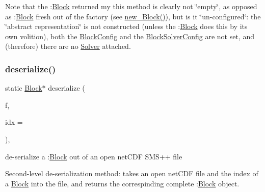 Note that the \+:\mbox{\hyperlink{class_s_m_spp__di__unipi__it_1_1_block}{Block}} returned my this method is clearly not \char`\"{}empty\char`\"{}, as opposed as \+:\mbox{\hyperlink{class_s_m_spp__di__unipi__it_1_1_block}{Block}} fresh out of the factory (see \mbox{\hyperlink{class_s_m_spp__di__unipi__it_1_1_block_a0fb67cbfab69b75e3bc6ad92d581bd2e}{new\+\_\+\+Block()}}), but is it \char`\"{}un-\/configured\char`\"{}\+: the \char`\"{}abstract representation\char`\"{} is not constructed (unless the \+:\mbox{\hyperlink{class_s_m_spp__di__unipi__it_1_1_block}{Block}} does this by its own volition), both the \mbox{\hyperlink{class_s_m_spp__di__unipi__it_1_1_block_config}{Block\+Config}} and the \mbox{\hyperlink{class_s_m_spp__di__unipi__it_1_1_block_solver_config}{Block\+Solver\+Config}} are not set, and (therefore) there are no \mbox{\hyperlink{class_s_m_spp__di__unipi__it_1_1_solver}{Solver}} attached. \mbox{\label{class_s_m_spp__di__unipi__it_1_1_block_afb0cada3cc11e452ec6da432cedc8906}} 
\subsubsection{\texorpdfstring{deserialize()}{deserialize()}\hspace{0.1cm}{\footnotesize\ttfamily [2/3]}}
{\footnotesize\ttfamily static \mbox{\hyperlink{class_s_m_spp__di__unipi__it_1_1_block}{Block}}$\ast$ deserialize (\begin{DoxyParamCaption}\item[{net\+C\+D\+F\+::\+Nc\+File \&\&}]{f,  }\item[{const unsigned int}]{idx = {} }\end{DoxyParamCaption})\hspace{0.3cm}{\ttfamily [inline]}, {\ttfamily [static]}}



de-\/serialize a \+:\mbox{\hyperlink{class_s_m_spp__di__unipi__it_1_1_block}{Block}} out of an open net\+C\+DF S\+M\+S++ file 

Second-\/level de-\/serialization method\+: takes an open net\+C\+DF file and the index of a \mbox{\hyperlink{class_s_m_spp__di__unipi__it_1_1_block}{Block}} into the file, and returns the correspinding complete \+:\mbox{\hyperlink{class_s_m_spp__di__unipi__it_1_1_block}{Block}} object.

